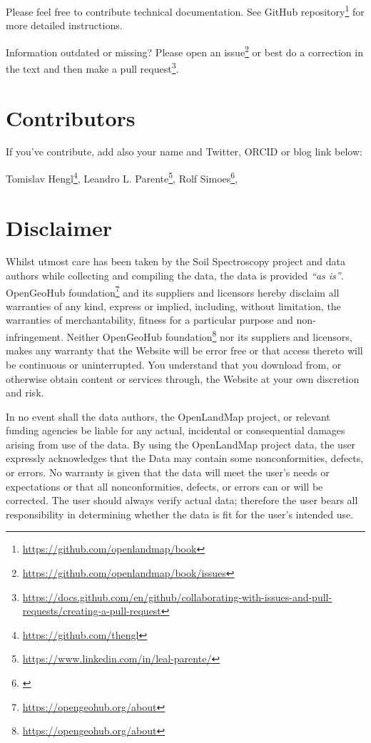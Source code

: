 \documentclass[
  graybox,natbib,nospthms]{svmono}
\renewcommand{\href}[2]{#2 (\url{#1})}
\renewcommand{\href}[2]{#2\footnote{\url{#1}}}
\begin{document}
Please feel free to contribute technical documentation. See \href{https://github.com/openlandmap/book}{GitHub
repository} for more detailed
instructions.

Information outdated or missing? Please \href{https://github.com/openlandmap/book/issues}{open an issue} or best do a
correction in the text and then make a \href{https://docs.github.com/en/github/collaborating-with-issues-and-pull-requests/creating-a-pull-request}{pull
request}.

\hypertarget{contributors}{%
\section*{Contributors}\label{contributors}}

If you've contribute, add also your name and Twitter, ORCID or blog link
below:

\href{https://github.com/thengl}{Tomislav Hengl},
\href{https://www.linkedin.com/in/leal-parente/}{Leandro L. Parente},
\href{}{Rolf Simoes},

\hypertarget{disclaimer}{%
\section*{Disclaimer}\label{disclaimer}}

Whilst utmost care has been taken by the Soil Spectroscopy project and data authors while
collecting and compiling the data, the data is provided \emph{``as is''}. \href{https://opengeohub.org/about}{OpenGeoHub foundation} and its
suppliers and licensors hereby disclaim all warranties of any kind, express or implied,
including, without limitation, the warranties of merchantability, fitness for a particular
purpose and non-infringement. Neither \href{https://opengeohub.org/about}{OpenGeoHub foundation} nor its suppliers and licensors,
makes any warranty that the Website will be error free or that access thereto will be
continuous or uninterrupted. You understand that you download from, or otherwise obtain
content or services through, the Website at your own discretion and risk.

In no event shall the data authors, the OpenLandMap project, or relevant funding
agencies be liable for any actual, incidental or consequential damages arising from use of the data.
By using the OpenLandMap project data, the user expressly acknowledges that the Data
may contain some nonconformities, defects, or errors. No warranty is given that the data will meet
the user's needs or expectations or that all nonconformities, defects, or errors can or will be
corrected. The user should always verify actual data; therefore the user bears all responsibility in
determining whether the data is fit for the user's intended use.
\end{document}

